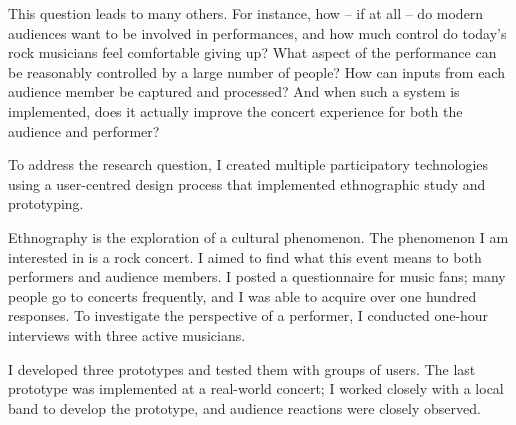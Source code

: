 This question leads to many others. For instance, how -- if at all -- do modern audiences want to be involved in performances, and how much control do today's rock musicians feel comfortable giving up? What aspect of the performance can be reasonably controlled by a large number of people? How can inputs from each audience member be captured and processed? And when such a system is implemented, does it actually improve the concert experience for both the audience and performer?


To address the research question, I created multiple participatory technologies using a user-centred design process that implemented ethnographic study and prototyping.

Ethnography is the exploration of a cultural phenomenon. The phenomenon I am interested in is a rock concert. I aimed to find what this event means to both performers and audience members. I posted a questionnaire for music fans; many people go to concerts frequently, and I was able to acquire over one hundred responses. To investigate the perspective of a performer, I conducted one-hour interviews with three active musicians.

I developed three prototypes and tested them with groups of users. The last prototype was implemented at a real-world concert; I worked closely with a local band to develop the prototype, and audience reactions were closely observed.


